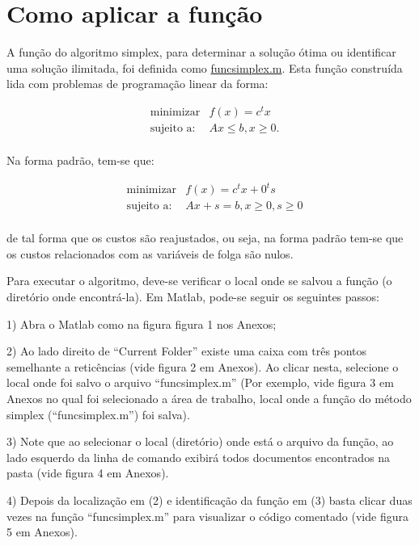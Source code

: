 \documentclass[10pt]{article}
\begin{document}
\section{Como aplicar a função}

A função do algoritmo simplex, para determinar a solução ótima ou identificar uma solução ilimitada, foi definida como \underline{funcsimplex.m}. Esta função construída lida com problemas de programação linear da forma:

\begin{align*}
&\text{minimizar}& f(x) = c^{t}x\\  
&\text{sujeito a:}& Ax \le b, x \ge 0.\\
\end{align*}  

Na forma padrão, tem-se que:

\begin{align*}
&\text{minimizar}& f(x) = c^{t}x + 0^{t}s\\  
&\text{sujeito a:}& Ax + s = b, x \ge 0, s \ge 0\\
\end{align*}  

de tal forma que os custos são reajustados, ou seja, na forma padrão tem-se que os custos relacionados com as variáveis de folga são nulos.
\newline

Para executar o algoritmo, deve-se verificar o local onde se salvou a função (o diretório onde encontrá-la). Em Matlab, pode-se seguir os seguintes passos:
\newline

1) Abra o Matlab como na figura figura 1 nos Anexos;
\newline

2) Ao lado direito de ``Current Folder'' existe uma caixa com três pontos semelhante a reticências (vide figura 2 em Anexos). Ao clicar nesta, selecione o local onde foi salvo o arquivo ``funcsimplex.m'' (Por exemplo, vide figura 3 em Anexos no qual foi selecionado a área de trabalho, local onde a função do método simplex  (``funcsimplex.m'') foi salva).
\newline

3) Note que ao selecionar o local (diretório) onde está o arquivo da função, ao lado esquerdo da linha de comando exibirá todos documentos encontrados na pasta (vide figura 4 em Anexos).
\newline

4) Depois da localização em (2) e identificação da função em (3) basta clicar duas vezes na função ``funcsimplex.m'' para visualizar o código comentado (vide figura 5 em Anexos).
\newline
\end{document}
